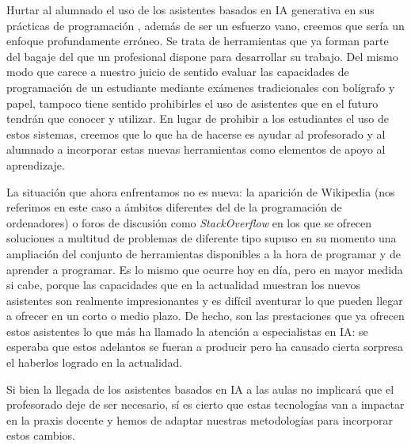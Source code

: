 \documentclass[twocolumn,twoside,a4paper, 10pt]{article}
\begin{document}
Hurtar al alumnado el uso de los asistentes basados en IA generativa en sus prácticas de programación
\cite{Cassidy:2023:AUR}, 
además de ser un esfuerzo vano, creemos que sería un enfoque profundamente erróneo.
Se trata de herramientas que ya forman parte del bagaje del que un profesional dispone para desarrollar su trabajo.
Del mismo modo que carece a nuestro juicio de sentido evaluar las capacidades de programación de un estudiante
mediante exámenes tradicionales con bolígrafo y papel, tampoco tiene sentido prohibirles el uso de
asistentes que en el futuro tendrán que conocer y utilizar.
En lugar de prohibir a los estudiantes el uso de estos sistemas, creemos que lo que ha de hacerse es ayudar
al profesorado y al alumnado a incorporar estas nuevas herramientas como elementos de apoyo al aprendizaje.

La situación que ahora enfrentamos no es nueva: la aparición de Wikipedia (nos referimos en este caso 
a ámbitos diferentes del de la programación de ordenadores) o foros de discusión como
\textit{StackOverflow} en los que se ofrecen soluciones a multitud de problemas de diferente tipo supuso en su
momento una ampliación del conjunto de herramientas disponibles a la hora de programar y de aprender a
programar.
Es lo mismo que ocurre hoy en día, pero en mayor medida si cabe, porque las capacidades que en la
actualidad muestran los nuevos asistentes son realmente impresionantes y es difícil aventurar lo que pueden
llegar a ofrecer en un corto o medio plazo.
De hecho, son las prestaciones que ya ofrecen estos asistentes lo que más ha llamado la atención a
especialistas en IA: se esperaba que estos adelantos se fueran a producir pero ha causado cierta sorpresa el
haberlos logrado en la actualidad.

Si bien la llegada de los asistentes basados en IA a las aulas no implicará que el profesorado deje de ser
necesario, sí es cierto que estas tecnologías van a impactar en la praxis docente y hemos de adaptar nuestras
metodologías para incorporar estos cambios.

\balance{}


\end{document}
